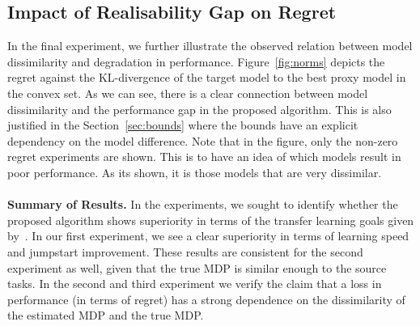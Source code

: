 \subsection{Impact of Realisability Gap on Regret}
In the final experiment, we further illustrate the observed relation between model dissimilarity and degradation in performance. Figure~\ref{fig:norms} depicts the regret against the KL-divergence of the target model to the best proxy model in the convex set. As we can see, there is a clear connection between model dissimilarity and the performance gap in the proposed algorithm. 
This is also justified in the Section~\ref{sec:bounds} where the bounds have an explicit dependency on the model difference. Note that in the figure, only the non-zero regret experiments are shown. This is to have an idea of which models result in poor performance. As its shown, it is those models that are very dissimilar.\\~\\
\noindent\textbf{Summary of Results.} In the experiments, we sought to identify whether the proposed algorithm shows superiority in terms of the transfer learning goals given by~\citet{langley2006transfer}. In our first experiment, we see a clear superiority in terms of learning speed and jumpstart improvement. These results are consistent for the second experiment as well, given that the true MDP is similar enough to the source tasks. In the second and third experiment we verify the claim that a loss in performance (in terms of regret) has a strong dependence on the dissimilarity of the estimated MDP and the true MDP.

